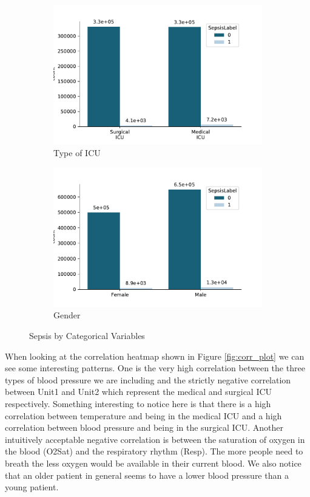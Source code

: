 \documentclass[10pt,letterpaper]{article}
\begin{document}
\begin{figure}[hbtp!]
\centering
\begin{subfigure}[b]{0.45\textwidth}
    \centering
    \includegraphics[scale = 0.6]{label_ICU.pdf}
    \caption{Type of ICU}
    \label{fig:label_ICU}
\end{subfigure}
\begin{subfigure}[b]{0.45\textwidth}
    \centering
    \includegraphics[scale = 0.6]{label_per_sex.pdf}
    \caption{Gender}
    \label{fig:label_per_sex}
\end{subfigure}
\caption{Sepsis by Categorical Variables}
\end{figure}

\par When looking at the correlation heatmap shown in Figure \ref{fig:corr_plot} we can see some interesting patterns. One is the very high correlation between the three types of blood pressure we are including and the strictly negative correlation between Unit1 and Unit2 which represent the medical and surgical ICU respectively. Something interesting to notice here is that there is a high correlation between temperature and being in the medical ICU and a high correlation between blood pressure and being in the surgical ICU. Another intuitively acceptable negative correlation is between the saturation of oxygen in the blood (O2Sat) and the respiratory rhythm (Resp). The more people need to breath the less oxygen would be available in their current blood. We also notice that an older patient in general seems to have a lower blood pressure than a young patient. 
\end{document}
